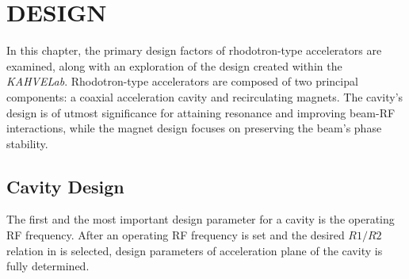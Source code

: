 \documentclass[a4paper,oneside,12pt]{report}
\numberwithin{equation}{chapter}
\begin{document}
\newpage


\chapter{DESIGN}


In this chapter, the primary design factors of rhodotron-type accelerators are examined, along with an exploration of the design created within the \textit{KAHVELab}. 
Rhodotron-type accelerators are composed of two principal components: a coaxial acceleration cavity and recirculating magnets. 
The cavity's design is of utmost significance for attaining resonance and improving beam-RF interactions, while the magnet design focuses on preserving the beam's phase stability.

\section{Cavity Design} \label{sec:cavity_design}

The first and the most important design parameter for a cavity is the operating RF frequency.
After an operating RF frequency is set and the desired $R1/R2$ relation in  is selected, design parameters of acceleration plane of the cavity is fully determined.
\end{document}
